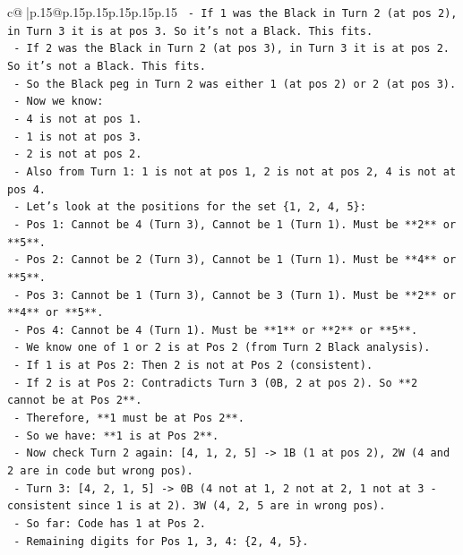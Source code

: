 \documentclass{article}
\begin{document}
{\begin{supertabular}{c@{$\;$}|p{.15\linewidth}@{}p{.15\linewidth}p{.15\linewidth}p{.15\linewidth}p{.15\linewidth}p{.15\linewidth}}
{{{\texttt{    {-} If 1 was the Black in Turn 2 (at pos 2), in Turn 3 it is at pos 3. So it's not a Black. This fits.} \\
\texttt{    {-} If 2 was the Black in Turn 2 (at pos 3), in Turn 3 it is at pos 2. So it's not a Black. This fits.} \\
\texttt{  {-} So the Black peg in Turn 2 was either 1 (at pos 2) or 2 (at pos 3).} \\
\texttt{  {-} Now we know:} \\
\texttt{    {-} 4 is not at pos 1.} \\
\texttt{    {-} 1 is not at pos 3.} \\
\texttt{    {-} 2 is not at pos 2.} \\
\texttt{    {-} Also from Turn 1: 1 is not at pos 1, 2 is not at pos 2, 4 is not at pos 4.} \\
\texttt{  {-} Let's look at the positions for the set \{1, 2, 4, 5\}:} \\
\texttt{    {-} Pos 1: Cannot be 4 (Turn 3), Cannot be 1 (Turn 1). Must be **2** or **5**.} \\
\texttt{    {-} Pos 2: Cannot be 2 (Turn 3), Cannot be 1 (Turn 1). Must be **4** or **5**.} \\
\texttt{    {-} Pos 3: Cannot be 1 (Turn 3), Cannot be 3 (Turn 1). Must be **2** or **4** or **5**.} \\
\texttt{    {-} Pos 4: Cannot be 4 (Turn 1). Must be **1** or **2** or **5**.} \\
\texttt{  {-} We know one of 1 or 2 is at Pos 2 (from Turn 2 Black analysis).} \\
\texttt{    {-} If 1 is at Pos 2: Then 2 is not at Pos 2 (consistent).} \\
\texttt{    {-} If 2 is at Pos 2: Contradicts Turn 3 (0B, 2 at pos 2). So **2 cannot be at Pos 2**.} \\
\texttt{    {-} Therefore, **1 must be at Pos 2**.} \\
\texttt{  {-} So we have: **1 is at Pos 2**.} \\
\texttt{  {-} Now check Turn 2 again: {[}4, 1, 2, 5{]} {-}> 1B (1 at pos 2), 2W (4 and 2 are in code but wrong pos).} \\
\texttt{  {-} Turn 3: {[}4, 2, 1, 5{]} {-}> 0B (4 not at 1, 2 not at 2, 1 not at 3 {-} consistent since 1 is at 2). 3W (4, 2, 5 are in wrong pos).} \\
\texttt{  {-} So far: Code has 1 at Pos 2.} \\
\texttt{  {-} Remaining digits for Pos 1, 3, 4: \{2, 4, 5\}.} \\
}}}
\end{supertabular}}
\end{document}
